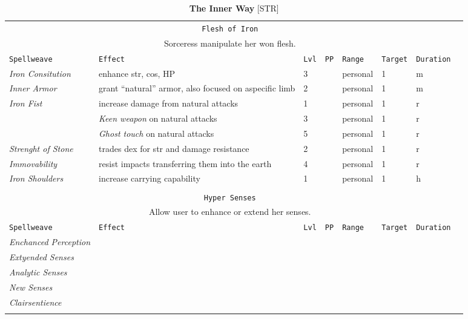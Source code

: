 \documentclass[10pt,a4paper]{article}
\begin{document}
\newpage
\begin{table}[htbp!]
\caption*{\textbf{\Large{The Inner Way}} [STR]}
\begin{tabular}{llllllll}
  \multicolumn{7}{c}{\texttt{Flesh of Iron}}\\
  \multicolumn{7}{c}{Sorceress manipulate her won flesh.}\\
    \hline
 \texttt{Spellweave} & \texttt{Effect} & \texttt{Lvl} & \texttt{PP} & \texttt{Range} & \texttt{Target} & \texttt{Duration} \\
    \hline
    \multirow{1}{*}{\textit{Iron Consitution}} & enhance str, cos, HP & 3 && personal & 1 & m\\
    \hline
    \multirow{1}{*}{\textit{Inner Armor}} & grant ``natural'' armor, also focused on aspecific limb & 2 && personal & 1 & m\\
    \hline
    \multirow{1}{*}{\textit{Iron Fist}} & increase damage from natural attacks & 1 && personal & 1 & r\\
    										    & \textit{Keen weapon} on natural attacks & 3 && personal & 1 & r\\   
												& \textit{Ghost touch} on natural attacks & 5 && personal & 1 & r\\    
    \hline
    \multirow{1}{*}{\textit{Strenght of Stone}} & trades dex for str and damage resistance & 2 && personal & 1 & r\\
    \hline
    \multirow{1}{*}{\textit{Immovability}} & resist impacts transferring them into the earth & 4 && personal & 1 & r\\    
    \hline
    \multirow{1}{*}{\textit{Iron Shoulders}} & increase carrying capability & 1 && personal & 1 & h\\
    &&&&&&\\
    
    
    
   \multicolumn{7}{c}{\texttt{Hyper Senses}}\\
  \multicolumn{7}{c}{Allow user to enhance or extend her senses.}\\
    \hline
 \texttt{Spellweave} & \texttt{Effect} & \texttt{Lvl} & \texttt{PP} & \texttt{Range} & \texttt{Target} & \texttt{Duration} \\
    \hline
    \multirow{1}{*}{\textit{Enchanced Perception}}&  & &&  &  & \\
    \hline
    \multirow{1}{*}{\textit{Extyended Senses}}&  & &&  &  & \\
    \hline
    \multirow{1}{*}{\textit{Analytic Senses}}&  & &&  &  & \\
    \hline
    \multirow{1}{*}{\textit{New Senses}}&  & &&  &  & \\
    \hline
    \multirow{1}{*}{\textit{Clairsentience}}&  & &&  &  & \\
	&&&&&&\\	
	

\end{tabular}
\end{table}
\end{document}
